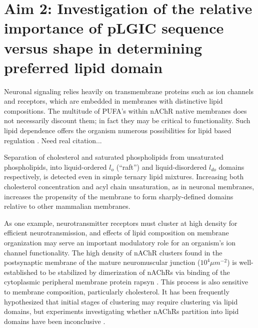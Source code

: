 \documentclass{article}
\begin{document}
\section{Aim 2: Investigation of the relative importance of pLGIC sequence versus shape in determining preferred lipid domain}

Neuronal signaling relies heavily on transmembrane proteins such as ion channels and receptors, which are embedded in membranes with distinctive lipid compositions. The multitude of PUFA's within nAChR native membranes does not necessarily discount them; in fact they may be critical to functionality. Such lipid dependence offers the organism numerous possibilities for lipid based regulation \cite{Lennon2003}. Need real citation...


Separation of cholesterol and saturated phospholipids from unsaturated phospholipids, into liquid-ordered $l_o$ (“raft”) and liquid-disordered $l_{do}$ domains respectively, is detected even in simple ternary lipid mixtures. Increasing both cholesterol concentration and acyl chain unsaturation, as in neuronal membranes, increases the propensity of the membrane to form sharply-defined domains relative to other mammalian membranes.

As one example, neurotransmitter receptors must cluster at high density for efficient neurotransmission, and effects of lipid composition on membrane organization may serve an important modulatory role for an organism's ion channel functionality. The high density of nAChR clusters found in the postsynaptic membrane of the mature neuromuscular junction ($10^4$$\mu m^{-2}$) is well-established to be stabilized by dimerization of nAChRs via binding of the cytoplasmic peripheral membrane protein rapsyn \cite{Zuber_Structure_2013}. This process is also sensitive to membrane composition, particularly cholesterol. It has been frequently hypothesized \cite{Zhu2006,Bruses2001} that initial stages of clustering may require clustering via lipid domains, but experiments investigating whether nAChRs partition into lipid domains have been inconclusive \cite{Bermdez_Partition_2010,Perillo2016}.
\end{document}
